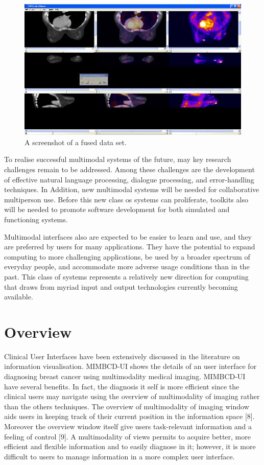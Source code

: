 \clearpage

\begin{figure}[!hbt]
\centering
\includegraphics[width=1.00\textwidth]{multimodalbreastimage.png}
\caption{\label{fig:screenshot}A screenshot of a fused data set.
}
\end{figure}

To realise successful multimodal systems of the future, may key research challenges remain to be addressed. Among these challenges are the development of effective natural language processing, dialogue processing, and error-handling techniques. In Addition, new multimodal systems will be needed for collaborative multiperson use. Before this new class os systems can proliferate, toolkits also will be needed to promote software development for both simulated and functioning systems.

Multimodal interfaces also are expected to be easier to learn and use, and they are preferred by users for many applications. They have the potential to expand computing to more challenging applications, be used by a broader spectrum of everyday people, and accommodate more adverse usage conditions than in the past. This class of systems represents a relatively new direction for computing that draws from myriad input and output technologies currently becoming available.

\section{Overview}

Clinical User Interfaces have been extensively discussed in the literature on information visualisation. MIMBCD-UI shows the details of an user interface for diagnosing breast cancer using multimodality medical imaging. MIMBCD-UI have several benefits. In fact, the diagnosis it self is more efficient since the clinical users may navigate using the overview of multimodality of imaging rather than the others techniques. The overview of multimodality of imaging window aids users in keeping track of their current position in the information space [8]. Moreover the overview window itself give users task-relevant information and a feeling of control [9]. A multimodality of views permits to acquire better, more efficient and flexible information and to easily diagnose in it; however, it is more difficult to users to manage information in a more complex user interface.

